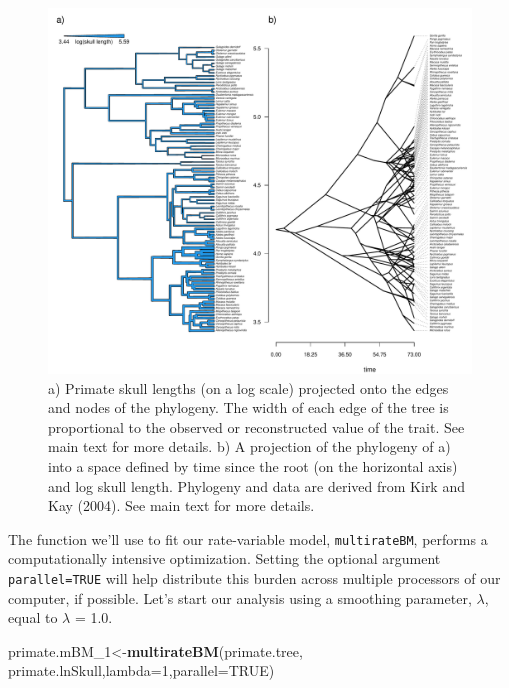 \documentclass[fleqn,10pt,lineno]{wlpeerj} %
\newenvironment{Shaded}{\begin{snugshade}}{\end{snugshade}}
\newcommand{\AttributeTok}[1]{\textcolor[rgb]{0.13,0.29,0.53}{#1}}
\newcommand{\ConstantTok}[1]{\textcolor[rgb]{0.56,0.35,0.01}{#1}}
\newcommand{\DecValTok}[1]{\textcolor[rgb]{0.00,0.00,0.81}{#1}}
\newcommand{\FunctionTok}[1]{\textcolor[rgb]{0.13,0.29,0.53}{\textbf{#1}}}
\newcommand{\NormalTok}[1]{#1}
\newcommand{\OtherTok}[1]{\textcolor[rgb]{0.56,0.35,0.01}{#1}}
\begin{document}
\begin{figure}
\includegraphics[width=1\linewidth]{Revell.phytools-v2_peerj_files/figure-latex/fig14-primate-edgewidth-1} \caption{a) Primate skull lengths (on a log scale) projected onto the edges and nodes of the phylogeny. The width of each edge of the tree is proportional to the observed or reconstructed value of the trait. See main text for more details. b) A projection of the phylogeny of a) into a space defined by time since the root (on the horizontal axis) and log skull length. Phylogeny and data are derived from Kirk and Kay (2004). See main text for more details.}\label{fig:fig14-primate-edgewidth}
\end{figure}

The function we'll use to fit our rate-variable model, \texttt{multirateBM}, performs a computationally intensive optimization. Setting the optional argument \texttt{parallel=TRUE} will help distribute this burden across multiple processors of our computer, if possible. Let's start our analysis using a smoothing parameter, \(\lambda\), equal to \(\lambda\) = 1.0.

\begin{Shaded}
\begin{Highlighting}[]
\NormalTok{primate.mBM\_1}\OtherTok{\textless{}{-}}\FunctionTok{multirateBM}\NormalTok{(primate.tree,}
\NormalTok{  primate.lnSkull,}\AttributeTok{lambda=}\DecValTok{1}\NormalTok{,}\AttributeTok{parallel=}\ConstantTok{TRUE}\NormalTok{)}
\end{Highlighting}
\end{Shaded}
\end{document}
